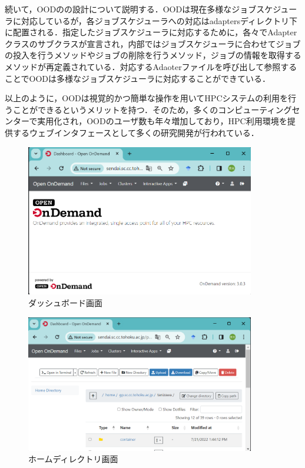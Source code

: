 続いて，OODのの設計について説明する．OODは現在多様なジョブスケジューラに対応しているが，各ジョブスケジューラへの対応はadaptersディレクトリ下に配置される．指定したジョブスケジューラに対応するために，各々でAdapterクラスのサブクラスが宣言され，内部ではジョブスケジューラに合わせてジョブの投入を行うメソッドやジョブの削除を行うメソッド，ジョブの情報を取得するメソッドが再定義されている．対応するAdaoterファイルを呼び出して参照することでOODは多様なジョブスケジューラに対応することができている．\par
以上のように，OODは視覚的かつ簡単な操作を用いてHPCシステムの利用を行うことができるというメリットを持つ．そのため，多くのコンピューティングセンターで実用化され，OODのユーザ数も年々増加しており，HPC利用環境を提供するウェブインタフェースとして多くの研究開発が行われている．\par

\begin{figure}[tb]
    \centering
    \includegraphics[width=100mm]{./fig/dashboard.png}
    \caption{ダッシュボード画面}
    \label{dashboard}
\end{figure}

\begin{figure}[tb]
    \centering
    \includegraphics[width=100mm]{./fig/homedirectory.png}
    \caption{ホームディレクトリ画面}
    \label{homedirectory}
\end{figure}

